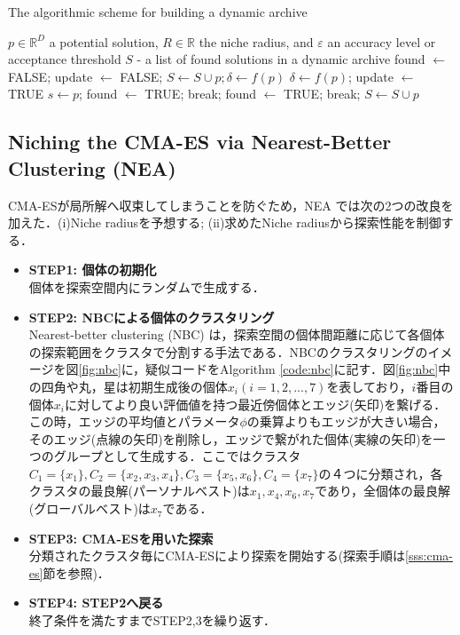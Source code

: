 \documentclass[a4j,11pt]{jarticle}
\begin{document}
\begin{algorithm}[H]
\caption{The algorithmic scheme for building a dynamic archive}
\label{code:dynA}
\begin{algorithmic}[3]
\REQUIRE $p \in \mathbb{R}^D$ a potential solution, $R \in \mathbb{R}$ the niche radius, and $\varepsilon$ an accuracy level or acceptance threshold
\ENSURE $S$ - a list of found solutions in a dynamic archive
\STATE found $\leftarrow$ FALSE; update $\leftarrow$ FALSE;
\STATE $S \leftarrow S \cup {p}; \delta \leftarrow f(p)$
\ELSE
{}
\STATE $\delta \leftarrow f(p)$; update $\leftarrow$ TRUE
\ENDIF
{}
\STATE $s \leftarrow p$;
\STATE found $\leftarrow$ TRUE;
\STATE break;
\ELSE
\STATE found $\leftarrow$ TRUE;
\STATE break;
\ENDIF
\ENDIF
\ENDFOR
{}
\STATE $S \leftarrow S \cup {p}$
\ENDIF
\ENDIF
\ENDIF
\end{algorithmic}
\end{algorithm}

\subsection{Niching the CMA-ES via Nearest-Better Clustering (NEA)}
\label{ss:nea}
CMA-ESが局所解へ収束してしまうことを防ぐため，NEA \cite{nea} では次の2つの改良を加えた．(i)Niche radiusを予想する; (ii)求めたNiche radiusから探索性能を制御する．

\begin{itemize}
\item {\bf STEP1: 個体の初期化} \\
個体を探索空間内にランダムで生成する．
\item {\bf STEP2: NBCによる個体のクラスタリング}\\
Nearest-better clustering (NBC) \cite{NBC} は，探索空間の個体間距離に応じて各個体の探索範囲をクラスタで分割する手法である．NBCのクラスタリングのイメージを図\ref{fig:nbc}に，疑似コードをAlgorithm \ref{code:nbc}に記す．図\ref{fig:nbc}中の四角や丸，星は初期生成後の個体$x_i (i=1,2,...,7)$を表しており，$i$番目の個体$x_i$に対してより良い評価値を持つ最近傍個体とエッジ(矢印)を繋げる．この時，エッジの平均値とパラメータ$\phi$の乗算よりもエッジが大きい場合，そのエッジ(点線の矢印)を削除し，エッジで繋がれた個体(実線の矢印)を一つのグループとして生成する．ここではクラスタ$C_1=\{x_1\}, C_2=\{x_2, x_3, x_4\}, C_3 = \{x_5, x_6\}, C_4=\{x_7\}$の４つに分類され，各クラスタの最良解(パーソナルベスト)は$x_1, x_4, x_6, x_7$であり，全個体の最良解(グローバルベスト)は$x_7$である．
\item {\bf STEP3: CMA-ESを用いた探索} \\
分類されたクラスタ毎にCMA-ESにより探索を開始する(探索手順は\ref{sss:cma-es}節を参照)．
\item {\bf STEP4: STEP2へ戻る}\\
終了条件を満たすまでSTEP2,3を繰り返す．
\end{itemize}
\end{document}
